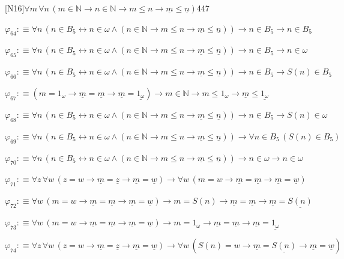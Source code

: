\begin{fullproof}{[N16]}{$\forall m\,\forall n\,(m \in \mathbb{N} \to n \in \mathbb{N} \to m \leq n \to \underline{m} \leq \underline{n})$}{447}
\begin{abbrevlist}
\item $\varphi_{64} :\equiv \forall n\,(n \in B_{5} \leftrightarrow n \in \omega \land (n \in \mathbb{N} \to m \leq n \to \underline{m} \leq \underline{n})) \to n \in B_{5} \to n \in B_{5}$
\item $\varphi_{65} :\equiv \forall n\,(n \in B_{5} \leftrightarrow n \in \omega \land (n \in \mathbb{N} \to m \leq n \to \underline{m} \leq \underline{n})) \to n \in B_{5} \to n \in \omega$
\item $\varphi_{66} :\equiv \forall n\,(n \in B_{5} \leftrightarrow n \in \omega \land (n \in \mathbb{N} \to m \leq n \to \underline{m} \leq \underline{n})) \to n \in B_{5} \to S(n) \in B_{5}$
\item $\varphi_{67} :\equiv (m = 1_{\omega} \to \underline{m} = \underline{m} \to \underline{m} = \underline{1_{\omega}}) \to m \in \mathbb{N} \to m \leq 1_{\omega} \to \underline{m} \leq \underline{1_{\omega}}$
\item $\varphi_{68} :\equiv \forall n\,(n \in B_{5} \leftrightarrow n \in \omega \land (n \in \mathbb{N} \to m \leq n \to \underline{m} \leq \underline{n})) \to n \in B_{5} \to S(n) \in \omega$
\item $\varphi_{69} :\equiv \forall n\,(n \in B_{5} \leftrightarrow n \in \omega \land (n \in \mathbb{N} \to m \leq n \to \underline{m} \leq \underline{n})) \to \forall n \in B_{5}\,(S(n) \in B_{5})$
\item $\varphi_{70} :\equiv \forall n\,(n \in B_{5} \leftrightarrow n \in \omega \land (n \in \mathbb{N} \to m \leq n \to \underline{m} \leq \underline{n})) \to n \in \omega \to n \in \omega$
\item $\varphi_{71} :\equiv \forall z\,\forall w\,(z = w \to \underline{m} = \underline{z} \to \underline{m} = \underline{w}) \to \forall w\,(m = w \to \underline{m} = \underline{m} \to \underline{m} = \underline{w})$
\item $\varphi_{72} :\equiv \forall w\,(m = w \to \underline{m} = \underline{m} \to \underline{m} = \underline{w}) \to m = S(n) \to \underline{m} = \underline{m} \to \underline{m} = \underline{S(n)}$
\item $\varphi_{73} :\equiv \forall w\,(m = w \to \underline{m} = \underline{m} \to \underline{m} = \underline{w}) \to m = 1_{\omega} \to \underline{m} = \underline{m} \to \underline{m} = \underline{1_{\omega}}$
\item $\varphi_{74} :\equiv \forall z\,\forall w\,(z = w \to \underline{m} = \underline{z} \to \underline{m} = \underline{w}) \to \forall w\,(S(n) = w \to \underline{m} = \underline{S(n)} \to \underline{m} = \underline{w})$

\end{abbrevlist}
\end{fullproof}
